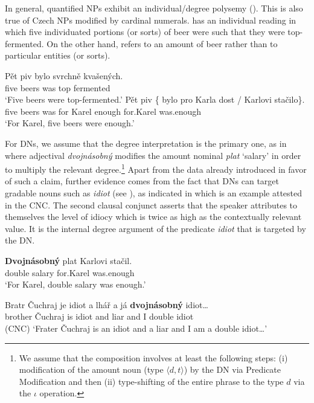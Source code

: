 \documentclass[output=paper,
modfonts,
hidelinks,
newtxmath
]{langscibook}
\begin{document}
In general, quantified NPs exhibit an individual/degree polysemy (\citealt{rett_polysemy_2014}). This is also true of Czech NPs modified by cardinal numerals.  has an individual reading in which five individuated portions (or sorts) of beer were such that they were top-fermented. On the other hand,  refers to an amount of beer rather than to particular entities (or sorts).

\ea \ea \gll Pět piv bylo svrchně kvašených.\label{individual-reading}\\
five beers was top fermented\\
\glt `Five beers were top-fermented.'
\ex \gll Pět piv \{\hspace{-2pt} bylo pro Karla dost / Karlovi stačilo\}.\label{degree-reading}\\
five beers {} was for Karel enough {} for.Karel was.enough\\
\glt `For Karel, five beers were enough.'
\z \z

\noindent For DNs, we assume that the degree interpretation is the primary one, as in  where adjectival \textit{dvojnásobný} modifies the amount nominal \textit{plat} `salary' in order to multiply the relevant degree.\footnote{We assume that the composition involves at least the following steps: (i) modification of the amount noun (type $\langle d,t\rangle$) by the DN via Predicate Modification and then (ii) type-shifting of the entire phrase to the type $d$ via the $\iota$ operation.} Apart from the data already introduced in favor of such a claim, further evidence comes from the fact that DNs can target gradable nouns such as \textit{idiot} (see \citealt{morzycki2009degree}), as indicated in  which is an example attested in the CNC. The second clausal conjunct asserts that the speaker attributes to themselves the level of idiocy which is twice as high as the contextually relevant value. It is the internal degree argument of the predicate \textit{idiot} that is targeted by the DN.

\ea\label{dvojnasobne-degree-context} \gll \textbf{Dvojnásobný} plat Karlovi stačil.\\
double salary for.Karel was.enough\\
\glt `For Karel, double salary was enough.'
\z

\ea\label{dvojnasobny-idiot-cnc} \gll Bratr Čuchraj je idiot a lhář a já \textbf{dvojnásobný} idiot\ldots \label{dvojnasobny-idiot}\\
brother Čuchraj is idiot and liar and I double idiot\\\hfill(CNC)
\glt `Frater Čuchraj is an idiot and a liar and I am a double idiot\ldots'
\z
\end{document}

